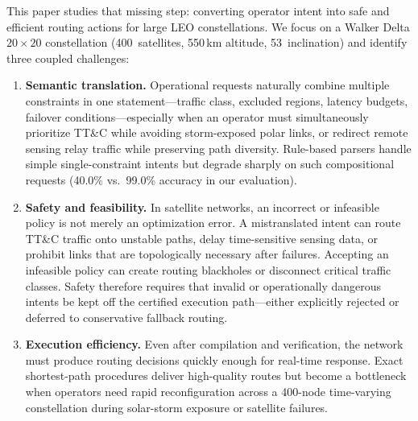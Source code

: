 \documentclass[10pt, conference, letterpaper]{IEEEtran}
\begin{document}
This paper studies that missing step: converting operator intent into
safe and efficient routing actions for large LEO constellations. We
focus on a Walker Delta $20\times20$ constellation (400~satellites,
550\,km altitude, 53\textdegree\ inclination) and identify three
coupled challenges:

\begin{enumerate}[leftmargin=*]
\item \textbf{Semantic translation.} Operational requests naturally
combine multiple constraints in one statement---traffic class,
excluded regions, latency budgets, failover conditions---especially
when an operator must simultaneously prioritize TT\&C while avoiding
storm-exposed polar links, or redirect remote sensing relay traffic
while preserving path diversity. Rule-based parsers handle simple
single-constraint intents but degrade sharply on such compositional
requests (40.0\% vs.\ 99.0\% accuracy in our evaluation).

\item \textbf{Safety and feasibility.} In satellite networks, an
incorrect or infeasible policy is not merely an optimization error.
A mistranslated intent can route TT\&C traffic onto unstable paths,
delay time-sensitive sensing data, or prohibit links that are
topologically necessary after failures. Accepting an infeasible
policy can create routing blackholes or disconnect critical traffic
classes. Safety therefore requires that invalid or operationally
dangerous intents be kept off the certified execution path---either
explicitly rejected or deferred to conservative fallback routing.

\item \textbf{Execution efficiency.} Even after compilation and
verification, the network must produce routing decisions quickly
enough for real-time response. Exact shortest-path procedures deliver
high-quality routes but become a bottleneck when operators need rapid
reconfiguration across a 400-node time-varying constellation during
solar-storm exposure or satellite failures.
\end{enumerate}
\end{document}
